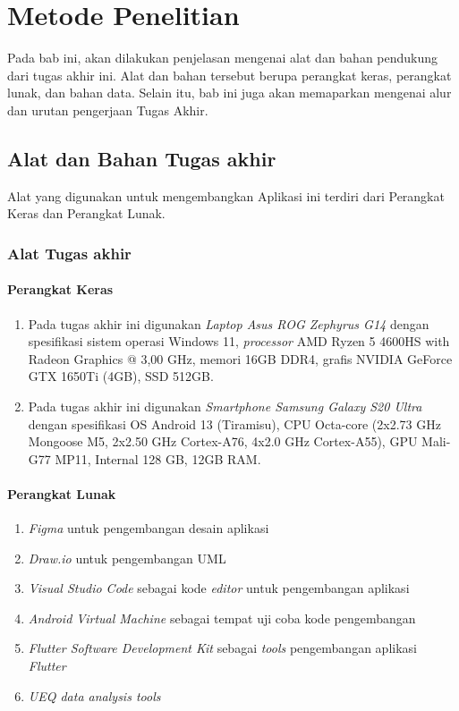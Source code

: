 \chapter{Metode Penelitian}
Pada bab ini, akan dilakukan penjelasan mengenai alat dan bahan pendukung dari tugas akhir ini.
Alat dan bahan tersebut berupa perangkat keras, perangkat lunak, dan bahan data.
Selain itu, bab ini juga akan memaparkan mengenai alur dan urutan pengerjaan Tugas Akhir.
\section{Alat dan Bahan Tugas akhir}
Alat yang digunakan untuk mengembangkan Aplikasi ini terdiri dari Perangkat Keras dan Perangkat Lunak.
\subsection{Alat Tugas akhir}
\subsubsection{Perangkat Keras}
\begin{enumerate}
	\item Pada tugas akhir ini digunakan \textit{Laptop Asus ROG Zephyrus G14} dengan spesifikasi sistem operasi Windows 11, \textit{processor} AMD Ryzen 5 4600HS with Radeon Graphics @ 3,00 GHz, memori 16GB DDR4, grafis NVIDIA GeForce GTX 1650Ti (4GB), SSD 512GB.
	\item Pada tugas akhir ini digunakan \textit{Smartphone Samsung Galaxy S20 Ultra} dengan spesifikasi OS Android 13 (Tiramisu), CPU Octa-core (2x2.73 GHz Mongoose M5, 2x2.50 GHz Cortex-A76, 4x2.0 GHz Cortex-A55), GPU Mali-G77 MP11, Internal 128 GB, 12GB RAM.
\end{enumerate}

\subsubsection{Perangkat Lunak}
\begin{enumerate}
	\item \textit{Figma} untuk pengembangan desain aplikasi
	\item \textit{Draw.io} untuk pengembangan UML
	\item \textit{Visual Studio Code} sebagai kode \textit{editor} untuk pengembangan aplikasi
	\item \textit{Android Virtual Machine} sebagai tempat uji coba kode pengembangan
	\item \textit{Flutter Software Development Kit} sebagai \textit{tools} pengembangan aplikasi \textit{Flutter}
	\item \textit{UEQ data analysis tools}
\end{enumerate}
\newpage

